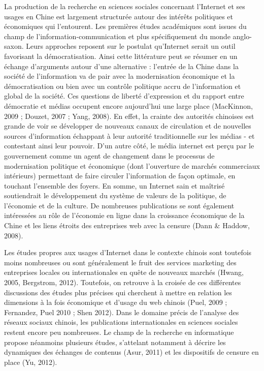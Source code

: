 \hypertarget{RefHeading31699228146}{}{\color{black}
La production de la recherche en sciences sociales concernant l'Internet et ses usages en Chine est largement
structur\'ee autour des int\'er\^ets politiques et \'economiques qui l'entourent. Les premi\`eres \'etudes
acad\'emiques sont issues du champ de l'information-communication et plus sp\'ecifiquement du monde anglo-saxon. Leurs
approches reposent sur le postulat qu'Internet serait un outil favorisant la d\'emocratisation. Ainsi cette
litt\'erature peut se r\'esumer en un \'echange d'arguments autour d'une alternative : l'entr\'ee de la Chine dans la
{\textquotedbl}soci\'et\'e de l'information{\textquotedbl} va de pair avec la modernisation \'economique et la
d\'emocratisation ou bien avec un contr\^ole politique accru de l'information et global de la soci\'et\'e. Ces
questions de libert\'e d'expression et du rapport entre d\'emocratie et m\'edias occupent encore aujourd'hui une large
place (MacKinnon, 2009 ; Douzet, 2007 ; Yang, 2008). En effet, la crainte des autorit\'es chinoises est grande de voir
se d\'evelopper de nouveaux canaux de circulation et de nouvelles sources d'information \'echappant \`a leur autorit\'e
traditionnelle sur les m\'edias - et contestant ainsi leur pouvoir. D'un autre c\^ot\'e, le m\'edia internet est
per\c{c}u par le gouvernement comme un agent de changement dans le processus de modernisation politique et \'economique
(dont l'ouverture de march\'es commerciaux int\'erieurs) permettant de faire circuler l'information de fa\c{c}on
optimale, en touchant l'ensemble des foyers. En somme, un Internet {\textquotedbl}sain{\textquotedbl} et ma\^itris\'e
soutiendrait le d\'eveloppement du syst\`eme de valeurs de la politique, de l'\'economie et de la culture. De
nombreuses publications se sont \'egalement int\'eress\'ees au r\^ole de l'\'economie en ligne dans la croissance
\'economique de la Chine et les liens \'etroits des entreprises web avec la censure (Dann \& Haddow, 2008).}


\bigskip

{\color{black}
Les \'etudes propres aux usages d'Internet dans le contexte chinois sont toutefois moins nombreuses ou sont
g\'en\'eralement le fruit des services marketing des entreprises locales ou internationales en qu\^ete de nouveaux
march\'es (Hwang, 2005, Bergstrom, 2012). Toutefois, on retrouve \`a la crois\'ee de ces diff\'erentes discussions des
\'etudes plus pr\'ecises qui cherchent \`a mettre en relation les dimensions \`a la fois \'economique et d'usage du web
chinois (Puel, 2009 ; Fernandez, Puel 2010 ; Shen 2012). Dans le domaine pr\'ecis de l'analyse des r\'eseaux sociaux
chinois, les publications internationales en sciences sociales restent encore peu nombreuses. Le champ de la recherche
en informatique propose n\'eanmoins plusieurs \'etudes, s'attelant notamment \`a d\'ecrire les dynamiques des
\'echanges de contenus (Asur, 2011) et les dispositifs de censure en place (Yu, 2012). }



